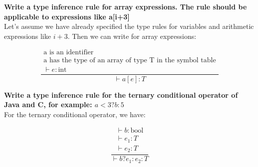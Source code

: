 \textbf{Write a type inference rule for array expressions. The rule should be applicable to expressions like a{[i+3]}} \\
Let's assume we have already specified the type rules for variables and arithmetic expressions like \(i+3\). Then we can write for array expressions:
\begin{center}
    \[
    \frac{
        \begin{array}{c}
        \text{a is an identifier} \\
        \text{a has the type of an array of type T in the symbol table} \\
        \vdash e : \text{int}
        \end{array}
    }{
        \vdash a[e] : T
    }
    \]
\end{center}
\textbf{Write a type inference rule for the ternary conditional operator of Java and C, for example:
$a<3 ? b : 5$} \\
For the ternary conditional operator, we have:
\begin{center}
    \[
    \frac{
        \begin{array}{c}
        \vdash b : \text{bool} \\
        \vdash e_1 : T \\
        \vdash e_2 : T
        \end{array}
    }{
        \vdash b ? e_1 : e_2 : T
    }
    \]
\end{center}
